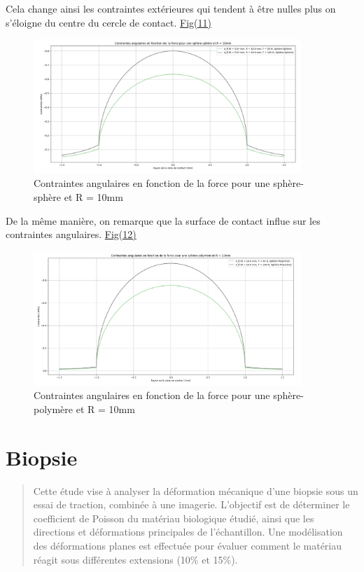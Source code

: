 \documentclass[a4paper,12pt]{article}
\begin{document}
Cela change ainsi les contraintes extérieures qui tendent à être nulles plus on s'éloigne du centre du cercle de contact. \hyperref[fig:mon_image11]{Fig(11)}
\begin{figure}[H] %
	\centering
	\includegraphics[width=0.9\textwidth]{ang3.png} %
	\caption{Contraintes angulaires en fonction de la force pour une sphère-sphère et R = 10mm} %
	\label{fig:mon_image11} %
\end{figure}
De la même manière, on remarque que la surface de contact influe sur les contraintes angulaires. \hyperref[fig:mon_image12]{Fig(12)}
\begin{figure}[H] %
	\centering
	\includegraphics[width=0.9\textwidth]{ang4.png} %
	\caption{Contraintes angulaires en fonction de la force pour une sphère-polymère et R = 10mm} %
	\label{fig:mon_image12} %
\end{figure}
\clearpage


\section{Biopsie}
\begin{abstract}
Cette étude vise à analyser la déformation mécanique d'une biopsie sous un essai de traction, combinée à une imagerie. L'objectif est de déterminer le coefficient de Poisson du matériau biologique étudié, ainsi que les directions et déformations principales de l'échantillon. Une modélisation des déformations planes est effectuée pour évaluer comment le matériau réagit sous différentes extensions (10\% et 15\%).
\end{abstract}
\end{document}
